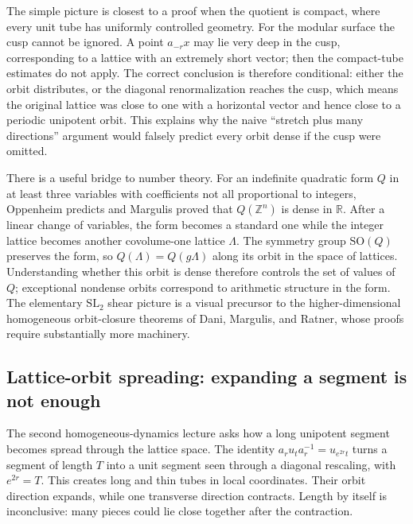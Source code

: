 The simple picture is closest to a proof when the quotient is compact, where every unit tube has uniformly controlled geometry. For the modular surface the cusp cannot be ignored. A point \(a_{-r}x\) may lie very deep in the cusp, corresponding to a lattice with an extremely short vector; then the compact-tube estimates do not apply. The correct conclusion is therefore conditional: either the orbit distributes, or the diagonal renormalization reaches the cusp, which means the original lattice was close to one with a horizontal vector and hence close to a periodic unipotent orbit. This explains why the naive ``stretch plus many directions'' argument would falsely predict every orbit dense if the cusp were omitted.

There is a useful bridge to number theory. For an indefinite quadratic form \(Q\) in at least three variables with coefficients not all proportional to integers, Oppenheim predicts and Margulis proved that \(Q(\mathbb Z^n)\) is dense in \(\mathbb R\). After a linear change of variables, the form becomes a standard one while the integer lattice becomes another covolume-one lattice \(\Lambda\). The symmetry group \(\mathrm{SO}(Q)\) preserves the form, so \(Q(\Lambda)=Q(g\Lambda)\) along its orbit in the space of lattices. Understanding whether this orbit is dense therefore controls the set of values of \(Q\); exceptional nondense orbits correspond to arithmetic structure in the form. The elementary \(\mathrm{SL}_2\) shear picture is a visual precursor to the higher-dimensional homogeneous orbit-closure theorems of Dani, Margulis, and Ratner, whose proofs require substantially more machinery.

\subsection{Lattice-orbit spreading: expanding a segment is not enough}\label{04-visual-computing-ii-ch033-lattice-orbit-spreading-expanding-a-segment-is-not-enough-1}

\hypertarget{04-visual-computing-ii-ch033-lattice-orbit-spreading-expanding-a-segment-is-not-enough-1}{}

The second homogeneous-dynamics lecture asks how a long unipotent segment becomes spread through the lattice space. The identity \(a_r u_t a_r^{-1}=u_{e^{2r}t}\) turns a segment of length \(T\) into a unit segment seen through a diagonal rescaling, with \(e^{2r}=T\). This creates long and thin tubes in local coordinates. Their orbit direction expands, while one transverse direction contracts. Length by itself is inconclusive: many pieces could lie close together after the contraction.

